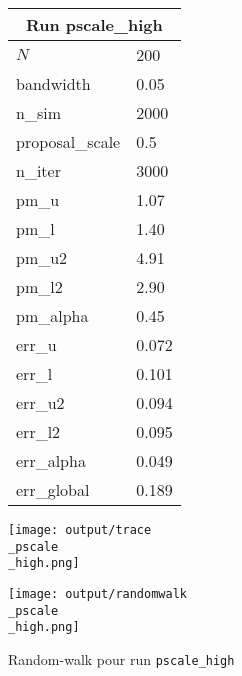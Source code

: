 
\begin{figure}[H]
  \centering
  \begin{minipage}[t]{0.45\textwidth}
    \vspace{0pt}
    \footnotesize
    \begin{tabular}{|l|l|}\hline
    \multicolumn{2}{|c|}{\textbf{Run pscale\_high}} \\ \hline
    $N$ & 200 \\ \hline
    bandwidth & 0.05 \\ \hline
    n\_sim & 2000 \\ \hline
    proposal\_scale & 0.5 \\ \hline
    n\_iter & 3000 \\ \hline
    pm\_u & 1.07 \\ \hline
    pm\_l & 1.40 \\ \hline
    pm\_u2 & 4.91 \\ \hline
    pm\_l2 & 2.90 \\ \hline
    pm\_alpha & 0.45 \\ \hline
    err\_u & 0.072 \\ \hline
    err\_l & 0.101 \\ \hline
    err\_u2 & 0.094 \\ \hline
    err\_l2 & 0.095 \\ \hline
    err\_alpha & 0.049 \\ \hline
    err\_global & 0.189 \\ \hline
    \end{tabular}
  \end{minipage}
  \hfill
  \begin{minipage}[t]{0.45\textwidth}
    \vspace{0pt}
    \texttt{[image: output/trace\\\_pscale\\\_high.png]}
  \end{minipage}
\end{figure}

\begin{figure}[H]
  \centering
  \texttt{[image: output/randomwalk\\\_pscale\\\_high.png]}
  \caption{Random-walk pour run \texttt{pscale\_high}}
\end{figure}

